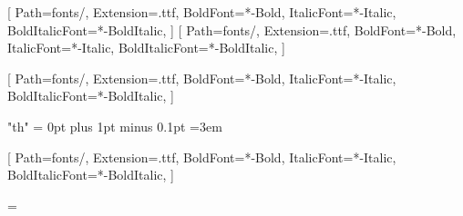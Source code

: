 




\setdefaultlanguage{thai}


\newfontfamily{}[
  Path=fonts/,
  Extension=.ttf,
  BoldFont=*-Bold,
  ItalicFont=*-Italic,
  BoldItalicFont=*-BoldItalic,
]
\newfontfamily{}[
  Path=fonts/,
  Extension=.ttf,
  BoldFont=*-Bold,
  ItalicFont=*-Italic,
  BoldItalicFont=*-BoldItalic,
]

\setmainfont[Scale=1.23,LetterSpace=0,WordSpace=1.0,FakeStretch=1.0,Mapping=tex-text]{THSarabunNew.ttf}[
  Path=fonts/,
  Extension=.ttf,
  BoldFont=*-Bold,
  ItalicFont=*-Italic,
  BoldItalicFont=*-BoldItalic,
]

\XeTeXlinebreaklocale "th"
\XeTeXlinebreakskip = 0pt plus 1pt minus 0.1pt
\emergencystretch=3em

\newfontfamily{}[
  Path=fonts/,
  Extension=.ttf,
  BoldFont=*-Bold,
  ItalicFont=*-Italic,
  BoldItalicFont=*-BoldItalic,
]


\newdimen\bodyfontsize
\ifdefined\reportbodysize \bodyfontsize=\reportbodysize \else \bodyfontsize=14.3pt \fi

